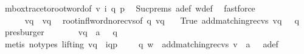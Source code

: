 \begin{isabellebody}
\ mbox{\isacharunderscore}{\kern0pt}trace{\isacharunderscore}{\kern0pt}to{\isacharunderscore}{\kern0pt}root{\isacharunderscore}{\kern0pt}word{\isacharbrackleft}{\kern0pt}of\ v\ i\ q\ p{\isacharbrackright}{\kern0pt}\ \isamarkupfalse%
\ Suc{\isachardot}{\kern0pt}prems{\isacharparenleft}{\kern0pt}{}{\isacharparenright}{\kern0pt}\ a{\isacharunderscore}{\kern0pt}def\ w{\isacharunderscore}{\kern0pt}def\ \isamarkupfalse%
\ fastforce\isanewline
\ \ \ \ \ \ \ \ \isanewline
\ \ \ \ \isamarkupfalse%
\ {\isachardoublequoteopen}{\isacharquery}{\kern0pt}v{\isacharprime}{\kern0pt}{\isasymdown}\isactrlsub q\ {\isacharequal}{\kern0pt}\ {\isacharparenleft}{\kern0pt}{\isacharquery}{\kern0pt}v{\isacharprime}{\kern0pt}{\isasymdown}\isactrlsub q{\isacharparenright}{\kern0pt}{\isasymdown}\isactrlsub {\isacharbang}{\kern0pt}{\isachardoublequoteclose}\ \isamarkupfalse%
\ root{\isacharunderscore}{\kern0pt}infl{\isacharunderscore}{\kern0pt}word{\isacharunderscore}{\kern0pt}no{\isacharunderscore}{\kern0pt}recvs{\isacharbrackleft}{\kern0pt}of\ q\ {\isachardoublequoteopen}{\isacharquery}{\kern0pt}v{\isacharprime}{\kern0pt}{\isasymdown}\isactrlsub q{\isachardoublequoteclose}\ {\isacharbrackright}{\kern0pt}\ \isamarkupfalse%
\ True\ {\isacartoucheopen}add{\isacharunderscore}{\kern0pt}matching{\isacharunderscore}{\kern0pt}recvs\ v{\isasymdown}\isactrlsub q\ {\isasymin}\ {\isasymL}\isactrlsup {\isacharasterisk}{\kern0pt}\ q{\isacartoucheclose}\ \isamarkupfalse%
\ presburger\isanewline
\ \ \ \ \isamarkupfalse%
\ \isamarkupfalse%
\ {\isachardoublequoteopen}{\isacharquery}{\kern0pt}v{\isacharprime}{\kern0pt}{\isasymdown}\isactrlsub q\ {\isasymsqdot}\ {\isacharbrackleft}{\kern0pt}a{\isacharbrackright}{\kern0pt}\ {\isasymin}\ {\isasymL}\isactrlsup {\isacharasterisk}{\kern0pt}\ q{\isachardoublequoteclose}\ \isamarkupfalse%
\ {\isacharparenleft}{\kern0pt}metis\ {\isacharparenleft}{\kern0pt}no{\isacharunderscore}{\kern0pt}types{\isacharcomma}{\kern0pt}\ lifting{\isacharparenright}{\kern0pt}\ {\isacartoucheopen}v{\isasymdown}\isactrlsub q\ {\isasymsqdot}\ {\isacharbang}{\kern0pt}{\isasymlangle}{\isacharparenleft}{\kern0pt}i\isactrlbsup q{\isasymrightarrow}p\isactrlesup {\isacharparenright}{\kern0pt}{\isasymrangle}\ {\isacharhash}{\kern0pt}\ {\isasymepsilon}\ {\isasymin}\ {\isasymL}\isactrlsup {\isacharasterisk}{\kern0pt}\ q{\isacartoucheclose}\ {\isacartoucheopen}w\ {\isacharequal}{\kern0pt}\ add{\isacharunderscore}{\kern0pt}matching{\isacharunderscore}{\kern0pt}recvs\ v{\isasymdown}\isactrlsub {\isacharbang}{\kern0pt}\ {\isasymsqdot}\ a\ {\isacharhash}{\kern0pt}\ {\isasymepsilon}{\isacartoucheclose}\ a{\isacharunderscore}{\kern0pt}def\isanewline

\end{isabellebody}
